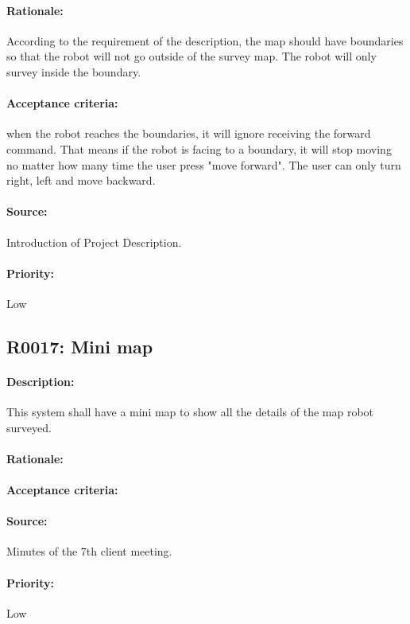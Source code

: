 \documentclass[11pt, a4paper]{report}
\begin{document}
\paragraph{Rationale:}
According to the requirement of the description, the map should have boundaries so that the robot will not go outside of the survey map. The robot will only survey inside the boundary.
\paragraph{Acceptance criteria:}
when the robot reaches the boundaries, it will ignore receiving the forward command. That means if the robot is facing to a boundary, it will stop moving no matter how many time the user press "move forward". The user can only turn right, left and move backward.
\paragraph{Source:}
 Introduction of Project Description.
\paragraph{Priority:}
Low


\subsection{R0017: Mini map}
\paragraph{Description:}
This system shall have a mini map to show all the details of the map robot surveyed.
\paragraph{Rationale:}

\paragraph{Acceptance criteria:}

\paragraph{Source:}
Minutes of the 7th client meeting.
\paragraph{Priority:}
Low
\end{document}
